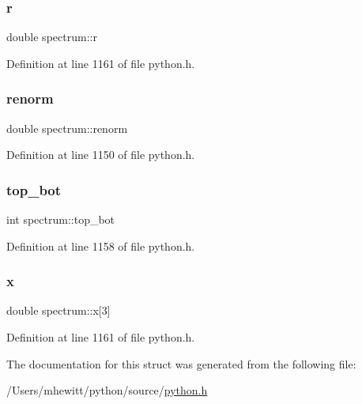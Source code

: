 \subsubsection{\texorpdfstring{r}{r}}
{\footnotesize\ttfamily double spectrum\+::r}



Definition at line 1161 of file python.\+h.

\mbox{\label{structspectrum_ad91af7b07731d63817326975b3e883d7}} 
\subsubsection{\texorpdfstring{renorm}{renorm}}
{\footnotesize\ttfamily double spectrum\+::renorm}



Definition at line 1150 of file python.\+h.

\mbox{\label{structspectrum_aa17c0e97d29cc7645d590f61487f503e}} 
\subsubsection{\texorpdfstring{top\+\_\+bot}{top\_bot}}
{\footnotesize\ttfamily int spectrum\+::top\+\_\+bot}



Definition at line 1158 of file python.\+h.

\mbox{\label{structspectrum_abd9f0618b17be2f3f1795059e0adf9e0}} 
\subsubsection{\texorpdfstring{x}{x}}
{\footnotesize\ttfamily double spectrum\+::x\mbox{[}3\mbox{]}}



Definition at line 1161 of file python.\+h.



The documentation for this struct was generated from the following file\+:\begin{DoxyCompactItemize}
\item 
/\+Users/mhewitt/python/source/\hyperlink{python_8h}{python.\+h}\end{DoxyCompactItemize}
